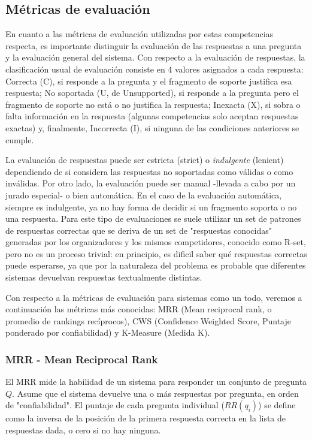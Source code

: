 \subsection{Métricas de evaluación}
\label{subsec:metricas}

En cuanto a las métricas de evaluación utilizadas por estas competencias respecta, es importante distinguir la evaluación de las respuestas a una pregunta y la evaluación general del sistema. Con respecto a la evaluación de respuestas, la clasificación usual de evaluación consiste en 4 valores asignados a cada respuesta: Correcta (C), si responde a la pregunta y el fragmento de soporte justifica esa respuesta; No soportada (U, de Unsupported), si responde a la pregunta pero el fragmento de soporte no está o no justifica la respuesta; Inexacta (X), si sobra o falta información en la respuesta (algunas competencias solo aceptan respuestas exactas) y, finalmente, Incorrecta (I), si ninguna de las condiciones anteriores se cumple. 

La evaluación de respuestas puede ser estricta (strict) o \textit{indulgente} (lenient) dependiendo de si considera las respuestas no soportadas como válidas o como inválidas. Por otro lado, la evaluación puede ser manual -llevada a cabo por un jurado especial- o bien automática. En el caso de la evaluación automática, siempre es indulgente, ya no hay forma de decidir si un fragmento soporta o no una respuesta. Para este tipo de evaluaciones se suele utilizar un set de patrones de respuestas correctas que se deriva de un set de "respuestas conocidas" generadas por los organizadores y los mismos competidores, conocido como R-set, pero no es un proceso trivial: en principio, es dificil saber qué respuestas correctas puede esperarse, ya que por la naturaleza del problema es probable que diferentes sistemas devuelvan respuestas textualmente distintas. 

Con respecto a la métricas de evaluación para sistemas como un todo, veremos a continuación las métricas más conocidas: MRR (Mean reciprocal rank, o promedio de rankings recíprocos), CWS (Confidence Weighted Score, Puntaje ponderado por confiabilidad) y K-Measure (Medida K).

\subsubsection*{MRR - Mean Reciprocal Rank}
El MRR mide la habilidad de un sistema para responder un conjunto de pregunta $Q$. Asume que el sistema devuelve una o más respuestas por pregunta, en orden de "confiabilidad". El puntaje de cada pregunta individual ($RR(q_i)$) se define como la inversa de la posición de la primera respuesta correcta en la lista de respuestas dada, o cero si no hay ninguna.

